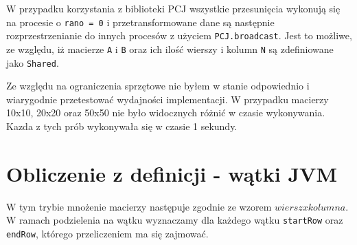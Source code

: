 \documentclass[11pt]{article}
\begin{document}
    W przypadku korzystania z biblioteki PCJ wszystkie przesunięcia wykonują się na procesie o \verb|rano = 0| i przetransformowane
    dane są następnie rozprzestrzenianie do innych procesów z użyciem \verb|PCJ.broadcast|. Jest to możliwe, ze względu, iż
    macierze \verb|A| i \verb|B| oraz ich ilość wierszy i kolumn \verb|N| są zdefiniowane jako \verb|Shared|.

    Ze względu na ograniczenia sprzętowe nie byłem w stanie odpowiednio i wiarygodnie przetestować wydajności implementacji.
    W przypadku macierzy 10x10, 20x20 oraz 50x50 nie było widocznych różnić w czasie wykonywania. Kazda z tych prób wykonywała
    się w czasie 1 sekundy.

    \section{Obliczenie z definicji - wątki JVM}

    W tym trybie mnożenie macierzy następuje zgodnie ze wzorem $wiersz x kolumna$. W ramach podzielenia na wątku wyznaczamy
    dla każdego wątku \verb|startRow| oraz \verb|endRow|, którego przeliczeniem ma się zajmować.
    
    
\end{document}
